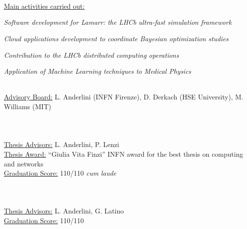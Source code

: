 \begin{cvcontent}
  \\ [0.5mm]
  \\ [1.5mm]
  \\ [1.5mm]
  {\normalsize \color{maincolor} \ul{Main activities carried out:}\\ [1.5mm]
  \begin{itemize*}[label=\textcolor{iconcolor}{\textbullet}]
    \item \emph{Software development for Lamarr: the LHCb ultra-fast simulation framework}\\ [0.5mm]
    \item \emph{Cloud applications development to coordinate Bayesian optimization studies}\\ [0.5mm]
    \item \emph{Contribution to the LHCb distributed computing operations}\\ [0.5mm]
    \item \emph{Application of Machine Learning techniques to Medical Physics}
  \end{itemize*}}\\ [1.5mm]
  \ul{Advisory Board:} L. Anderlini (INFN Firenze), D. Derkach (HSE University), M. Williams (MIT)
  \\ [6mm]
  \\ [0.5mm]
  \\ [1.5mm]
  \\ [1.5mm]
  \ul{Thesis Advisors:} L. Anderlini, P. Lenzi\\ [1.5mm]
  \ul{Thesis Award:} ``Giulia Vita Finzi'' INFN award for the best thesis on computing and networks\\ [1.5mm]
  \ul{Graduation Score:} 110/110 \emph{cum laude}
  \\ [6mm]
  \\ [0.5mm]
  \\ [1.5mm]
  \\ [1.5mm]
  \ul{Thesis Advisors:} L. Anderlini, G. Latino\\ [1.5mm]
  \ul{Graduation Score:} 110/110
\end{cvcontent}
